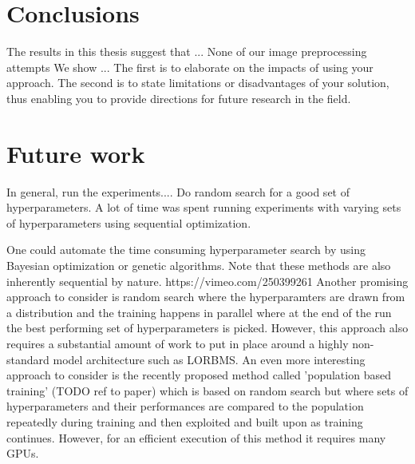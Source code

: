 \documentclass[12pt,a4paper]{article}
\begin{document}
\section{Conclusions}
The results in this thesis suggest that ...
None of our image preprocessing attempts
We show ...
The first is
to elaborate on the impacts of using your approach. The
second is to state limitations or disadvantages of your solution,
thus enabling you to provide directions for future
research in the field.


\section{Future work}
In general, run the experiments.... Do random search for a good set of hyperparameters. A lot of time was spent running experiments with varying sets of hyperparameters using sequential optimization.

\par One could automate the time consuming hyperparameter search by using Bayesian optimization or genetic algorithms. Note that these methods are also inherently sequential by nature. https://vimeo.com/250399261
Another promising approach to consider is random search where the hyperparamters are drawn from a distribution and the training happens in parallel where at the end of the run the best performing set of hyperparameters is picked. However, this approach also requires a substantial amount of work to put in place around a highly non-standard model architecture such as LORBMS. An even more interesting approach to consider is the recently proposed method called 'population based training' (TODO ref to paper) which is based on random search but where sets of hyperparameters and their performances are compared to the population repeatedly during training and then exploited and built upon as training continues. However, for an efficient execution of this method it requires many GPUs. 
\end{document}
